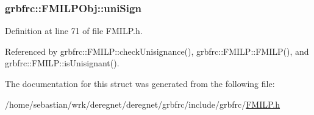 \subsubsection[{\texorpdfstring{uni\+Sign}{uniSign}}]{ grbfrc\+::\+F\+M\+I\+L\+P\+Obj\+::uni\+Sign}\hypertarget{structgrbfrc_1_1FMILPObj_ab5f06f05e7cb926e59e3f70978f69d5c}{}\label{structgrbfrc_1_1FMILPObj_ab5f06f05e7cb926e59e3f70978f69d5c}


Definition at line 71 of file F\+M\+I\+L\+P.\+h.



Referenced by grbfrc\+::\+F\+M\+I\+L\+P\+::check\+Unisignance(), grbfrc\+::\+F\+M\+I\+L\+P\+::\+F\+M\+I\+L\+P(), and grbfrc\+::\+F\+M\+I\+L\+P\+::is\+Unisignant().



The documentation for this struct was generated from the following file\+:\begin{DoxyCompactItemize}
\item 
/home/sebastian/wrk/deregnet/deregnet/grbfrc/include/grbfrc/\hyperlink{FMILP_8h}{F\+M\+I\+L\+P.\+h}\end{DoxyCompactItemize}
